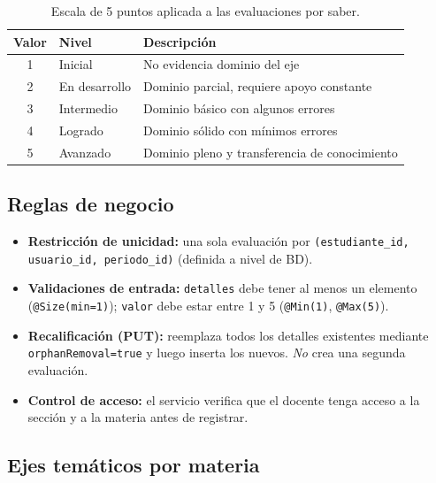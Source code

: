 \documentclass[11pt,a4paper,oneside]{article}
\newcommand{\code}[1]{\texttt{\small #1}}
\begin{document}
\begin{table}[h]
\centering\renewcommand{\arraystretch}{1.15}\small
\begin{tabular}{@{}c l p{8.5cm}@{}}
\toprule
\textbf{Valor} & \textbf{Nivel} & \textbf{Descripción} \\
\midrule
1 & Inicial       & No evidencia dominio del eje \\
2 & En desarrollo & Dominio parcial, requiere apoyo constante \\
3 & Intermedio    & Dominio básico con algunos errores \\
4 & Logrado       & Dominio sólido con mínimos errores \\
5 & Avanzado      & Dominio pleno y transferencia de conocimiento \\
\bottomrule
\end{tabular}
\caption{Escala de 5 puntos aplicada a las evaluaciones por saber.}
\end{table}

\subsection{Reglas de negocio}

\begin{ataraInfo}
\begin{itemize}[leftmargin=*]
  \item \textbf{Restricción de unicidad:} una sola evaluación por
        \code{(estudiante\_id, usuario\_id, periodo\_id)} (definida a nivel de BD).
  \item \textbf{Validaciones de entrada:} \code{detalles} debe tener al menos un elemento
        (\code{@Size(min=1)}); \code{valor} debe estar entre 1 y 5
        (\code{@Min(1)}, \code{@Max(5)}).
  \item \textbf{Recalificación (PUT):} reemplaza todos los detalles existentes mediante
        \code{orphanRemoval=true} y luego inserta los nuevos. \emph{No} crea una segunda
        evaluación.
  \item \textbf{Control de acceso:} el servicio verifica que el docente tenga acceso a la
        sección y a la materia antes de registrar.
\end{itemize}
\end{ataraInfo}

\subsection{Ejes temáticos por materia}
\end{document}
